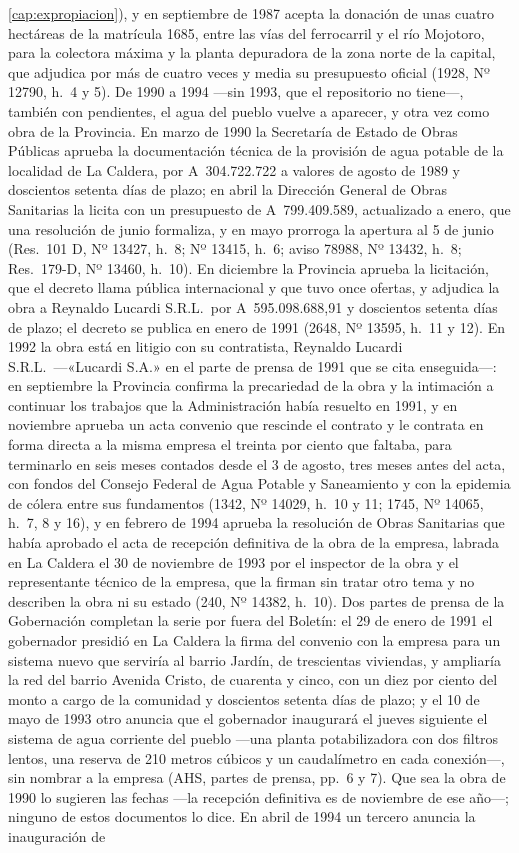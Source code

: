 \ref{cap:expropiacion}), y en septiembre de 1987 acepta la donación de unas cuatro hectáreas de la matrícula 1685, entre las vías del ferrocarril y el río Mojotoro, para la colectora máxima y la planta depuradora de la zona norte de la capital, que adjudica por más de cuatro veces y media su presupuesto oficial (1928, Nº 12790, h.\ 4 y 5). De 1990 a 1994 ---sin 1993, que el repositorio no tiene---, también con pendientes, el agua del pueblo vuelve a aparecer, y otra vez como obra de la Provincia. En marzo de 1990 la Secretaría de Estado de Obras Públicas aprueba la documentación técnica de la provisión de agua potable de la localidad de La Caldera, por A~304.722.722 a valores de agosto de 1989 y doscientos setenta días de plazo; en abril la Dirección General de Obras Sanitarias la licita con un presupuesto de A~799.409.589, actualizado a enero, que una resolución de junio formaliza, y en mayo prorroga la apertura al 5 de junio (Res.\ 101 D, Nº 13427, h.\ 8; Nº 13415, h.\ 6; aviso 78988, Nº 13432, h.\ 8; Res.\ 179-D, Nº 13460, h.\ 10). En diciembre la Provincia aprueba la licitación, que el decreto llama pública internacional y que tuvo once ofertas, y adjudica la obra a Reynaldo Lucardi S.R.L.\ por A~595.098.688,91 y doscientos setenta días de plazo; el decreto se publica en enero de 1991 (2648, Nº 13595, h.\ 11 y 12). En 1992 la obra está en litigio con su contratista, Reynaldo Lucardi S.R.L.\ ---«Lucardi S.A.» en el parte de prensa de 1991 que se cita enseguida---: en septiembre la Provincia confirma la precariedad de la obra y la intimación a continuar los trabajos que la Administración había resuelto en 1991, y en noviembre aprueba un acta convenio que rescinde el contrato y le contrata en forma directa a la misma empresa el treinta por ciento que faltaba, para terminarlo en seis meses contados desde el 3 de agosto, tres meses antes del acta, con fondos del Consejo Federal de Agua Potable y Saneamiento y con la epidemia de cólera entre sus fundamentos (1342, Nº 14029, h.\ 10 y 11; 1745, Nº 14065, h.\ 7, 8 y 16), y en febrero de 1994 aprueba la resolución de Obras Sanitarias que había aprobado el acta de recepción definitiva de la obra de la empresa, labrada en La Caldera el 30 de noviembre de 1993 por el inspector de la obra y el representante técnico de la empresa, que la firman sin tratar otro tema y no describen la obra ni su estado (240, Nº 14382, h.\ 10). Dos partes de prensa de la Gobernación completan la serie por fuera del Boletín: el 29 de enero de 1991 el gobernador presidió en La Caldera la firma del convenio con la empresa para un sistema nuevo que serviría al barrio Jardín, de trescientas viviendas, y ampliaría la red del barrio Avenida Cristo, de cuarenta y cinco, con un diez por ciento del monto a cargo de la comunidad y doscientos setenta días de plazo; y el 10 de mayo de 1993 otro anuncia que el gobernador inaugurará el jueves siguiente el sistema de agua corriente del pueblo ---una planta potabilizadora con dos filtros lentos, una reserva de 210 metros cúbicos y un caudalímetro en cada conexión---, sin nombrar a la empresa (AHS, partes de prensa, pp.~6 y 7). Que sea la obra de 1990 lo sugieren las fechas ---la recepción definitiva es de noviembre de ese año---; ninguno de estos documentos lo dice. En abril de 1994 un tercero anuncia la inauguración de 